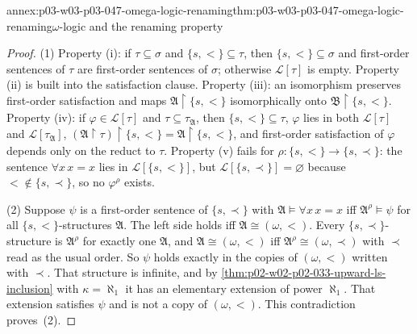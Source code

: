 \begin{annexitem}{annex:p03-w03-p03-047-omega-logic-renaming}{thm:p03-w03-p03-047-omega-logic-renaming}{\(\omega\)-logic and the renaming property}
\begin{proof}
(1) Property (i): if \(\tau\subseteq\sigma\) and \(\{s,<\}\subseteq\tau\),
then \(\{s,<\}\subseteq\sigma\) and first-order sentences of \(\tau\) are
first-order sentences of \(\sigma\); otherwise \(\mathscr L[\tau]\) is empty.
Property (ii) is built into the satisfaction clause.  Property (iii): an
isomorphism preserves first-order satisfaction and maps
\(\mathfrak A\restriction\{s,<\}\) isomorphically onto
\(\mathfrak B\restriction\{s,<\}\).  Property (iv): if
\(\varphi\in\mathscr L[\tau]\) and \(\tau\subseteq\tau_{\mathfrak A}\), then
\(\{s,<\}\subseteq\tau\), \(\varphi\) lies in both
\(\mathscr L[\tau]\) and \(\mathscr L[\tau_{\mathfrak A}]\),
\((\mathfrak A\restriction\tau)\restriction\{s,<\}=\mathfrak A\restriction\{s,<\}\),
and first-order satisfaction of \(\varphi\) depends only on the reduct to
\(\tau\).  Property (v) fails for \(\rho:\{s,<\}\to\{s,\prec\}\): the sentence
\(\forall x\,x=x\) lies in \(\mathscr L[\{s,<\}]\), but
\(\mathscr L[\{s,\prec\}]=\varnothing\) because \(<\notin\{s,\prec\}\), so no
\(\varphi^\rho\) exists.

(2) Suppose \(\psi\) is a first-order sentence of \(\{s,\prec\}\) with
\(\mathfrak A\models\forall x\,x=x\) iff \(\mathfrak A^\rho\models\psi\) for
all \(\{s,<\}\)-structures \(\mathfrak A\).  The left side holds iff
\(\mathfrak A\cong(\omega,<)\).  Every \(\{s,\prec\}\)-structure is
\(\mathfrak A^\rho\) for exactly one \(\mathfrak A\), and
\(\mathfrak A\cong(\omega,<)\) iff \(\mathfrak A^\rho\cong(\omega,\prec)\)
with \(\prec\) read as the usual order.  So \(\psi\) holds exactly in the
copies of \((\omega,<)\) written with \(\prec\).  That structure is infinite,
and by \cref{thm:p02-w02-p02-033-upward-ls-inclusion} with
\(\kappa=\aleph_1\) it has an elementary extension of power \(\aleph_1\).
That extension satisfies \(\psi\) and is not a copy of \((\omega,<)\).  This contradiction proves~(2).
\end{proof}
\end{annexitem}

